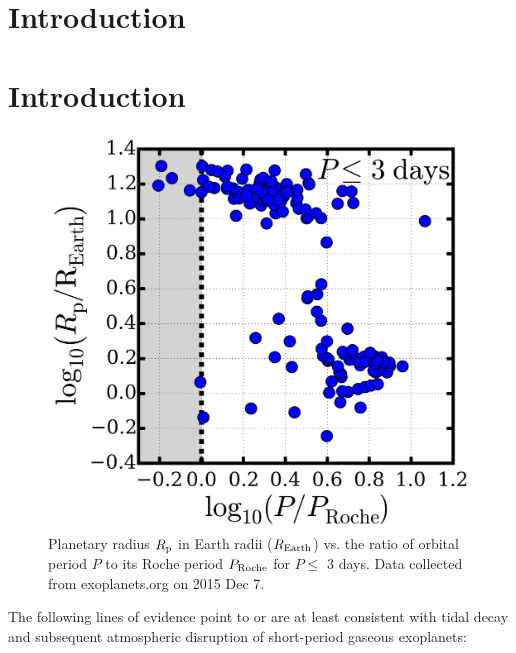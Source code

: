 \documentclass[smallcondensed]{svjour3}    %
\begin{document}
\section{Introduction}
\label{sec:introduction}

\section{Introduction}

\begin{figure}
\includegraphics[width=\textwidth]{P-PRoche.png}
\caption{Planetary radius $R_{\rm p}$ in Earth radii ($R_{\rm Earth}$) vs. the ratio of orbital period $P$ to its Roche period $P_{\rm Roche}$ for $P \leq$ 3 days. Data collected from exoplanets.org on 2015 Dec 7.}
\label{fig:P-PRoche}
\end{figure}

The following lines of evidence point to or are at least consistent with tidal decay and subsequent atmospheric disruption of short-period gaseous exoplanets:
\end{document}
